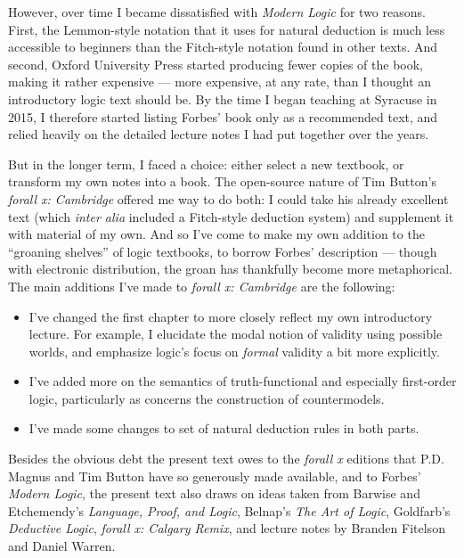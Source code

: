 However, over time I became dissatisfied with \emph{Modern Logic} for two reasons.  First, the Lemmon-style notation that it uses for natural deduction is much less accessible to beginners than the Fitch-style notation found in other texts.  And second, Oxford University Press started producing fewer copies of the book, making it rather expensive --- more expensive, at any rate, than I thought an introductory logic text should be.  By the time I began teaching at Syracuse in 2015, I therefore started listing Forbes' book only as a recommended text, and relied heavily on the detailed lecture notes I had put together over the years.

But in the longer term, I faced a choice: either select a new textbook, or transform my own notes into a book.  The open-source nature of Tim Button's \emph{forall x: Cambridge} offered me way to do both: I could take his already excellent text (which \emph{inter alia} included a Fitch-style deduction system) and supplement it with material of my own.  And so I've come to make my own addition to the ``groaning shelves'' of logic textbooks, to borrow Forbes' description --- though with electronic distribution, the groan has thankfully become more metaphorical. The main additions I've made to \emph{forall x: Cambridge} are the following:
\begin{itemize}
\item I've changed the first chapter to more closely reflect my own introductory lecture.  For example, I elucidate the modal notion of validity using possible worlds, and emphasize logic's focus on \emph{formal} validity a bit more explicitly.
\item I've added more on the semantics of truth-functional and especially first-order logic, particularly as concerns the construction of countermodels.  
\item I've made some changes to set of natural deduction rules in both parts.
\end{itemize}
Besides the obvious debt the present text owes to the \emph{forall x} editions that P.D. Magnus and Tim Button have so generously made available,  and to Forbes' \emph{Modern Logic}, the present text also draws on ideas taken from Barwise and Etchemendy's \emph{Language, Proof, and Logic}, Belnap's \emph{The Art of Logic}, Goldfarb's \emph{Deductive Logic}, \emph{forall x: Calgary Remix}, and lecture notes by Branden Fitelson and Daniel Warren.


